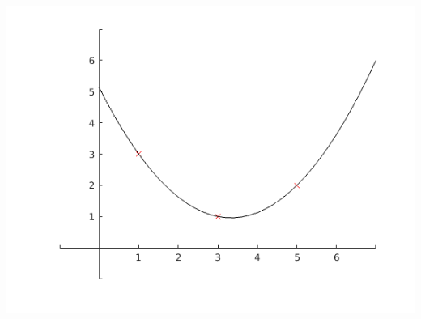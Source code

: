 \documentclass[MathsNotesBase.tex]{subfiles}
\begin{document}
{	
	\begin{center}
	\includegraphics[width=\linewidth]{figure_4.png}
	\end{center}

	\bigskip\bigskip
}
\end{document}
